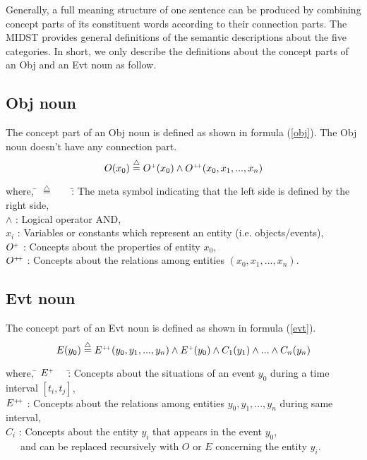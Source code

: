 Generally, a full meaning structure of one sentence can be produced by
combining concept parts of its constituent words according to their
connection parts.  The MIDST provides general definitions of the
semantic descriptions about the five categories. In short, we only
describe the definitions about the concept parts of an Obj and an Evt
noun as follow.

\subsection{Obj noun}
\vspace*{-0.1cm}
 The concept part of an Obj noun is defined as shown in formula
(\ref{obj}). The Obj noun doesn't have any connection part.
\vspace*{-0.1cm}
\begin{equation}
O(x_0) \stackrel{\triangle}{=} O^{\mbox{\tiny $+$}}(x_0) \wedge
O^{\mbox{\tiny $+\!+$}}(x_0,x_1,...,x_n) \label{obj}
\end{equation}
\begin{tabbing}
 where, \= $\stackrel{\triangle}{=}$ \ \ \ \= : The meta symbol indicating
 that the left side is defined by the right side,\\
	\> $\wedge$ \>: Logical operator AND,\\
        \> $x_i$ \>: Variables or constants which represent an entity
 (i.e. objects/events),\\
        \> $O^{\mbox{\tiny $+$}}$ \>: Concepts about the properties 
of entity $x_0$,\\
        \> $O^{\mbox{\tiny $+\!+$}}$ \>: Concepts about the relations
 among entities $(x_0,x_1,...,x_n)$.
\end{tabbing}

\subsection{Evt noun}
The concept part of an Evt noun is defined as shown in formula (\ref{evt}).
\begin{equation}
 E(y_0) \stackrel{\triangle}{=} E^{\mbox{\tiny $+\!+$}}(y_0,y_1,...,y_n) 
\wedge E^{\mbox{\tiny $+$}}(y_0) \wedge C_1(y_1) \wedge ... 
\wedge C_n(y_n) \label{evt} 
\end{equation}
\begin{tabbing}
 where,  \= $E^{\mbox{\tiny $+$}}$ \ \ \= : Concepts about the 
situations of an event $y_0$ during a time interval $[t_i,t_j]$,\\
        \> $E^{\mbox{\tiny $+\!+$}}$ \> : Concepts about the relations 
among entities $y_0,y_1,...,y_n$ during same interval,\\
        \> $C_i$ \> : Concepts about the entity $y_i$ that appears 
in the event $y_0$,\\
        \>       \> \ \ \ and can be replaced recursively with $O$ 
or $E$ concerning the entity $y_i$.
\end{tabbing}

